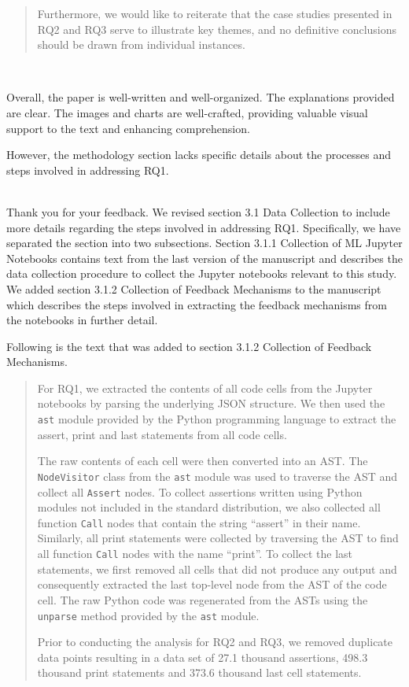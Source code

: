 \documentclass[11pt,fleqn]{article}
\newcommand{\eline}{\vspace*{.75\baselineskip}}
\newcommand{\Referee}[1]{\eline \noindent {\bf Reviewer comment #1:} \\}
\newcommand{\Us}{\eline \noindent {\bf Response:}\\}
\newenvironment{revcomment}[1][]
{\Referee{#1}\begin{rcomment}}
{\end{rcomment}}
\begin{document}
\begin{quote}
  Furthermore, we would like to reiterate that the case studies presented in RQ2 and RQ3 serve to illustrate key themes, and no definitive conclusions should be drawn from individual instances.
\end{quote}

\begin{revcomment}[1.7]
  Overall, the paper is well-written and well-organized. The explanations provided are clear. The images and charts are well-crafted, providing valuable visual support to the text and enhancing comprehension.

  However, the methodology section lacks specific details about the processes and steps involved in addressing RQ1.
\end{revcomment}

\Us Thank you for your feedback. We revised section 3.1 Data Collection to include more details regarding the steps involved in addressing RQ1. Specifically, we have separated the section into two subsections. Section 3.1.1 Collection of ML Jupyter Notebooks contains text from the last version of the manuscript and describes the data collection procedure to collect the Jupyter notebooks relevant to this study. We added section 3.1.2 Collection of Feedback Mechanisms to the manuscript which describes the steps involved in extracting the feedback mechanisms from the notebooks in further detail.

Following is the text that was added to section 3.1.2 Collection of Feedback Mechanisms.

\begin{quote}
  For RQ1, we extracted the contents of all code cells from the Jupyter notebooks by parsing the underlying JSON structure. We then used the \texttt{ast} module provided by the Python programming language to extract the assert, print and last statements from all code cells.

  The raw contents of each cell were then converted into an AST. The \texttt{NodeVisitor} class from the \texttt{ast} module was used to traverse the AST and collect all \texttt{Assert} nodes. To collect assertions written using Python modules not included in the standard distribution, we also collected all function \texttt{Call} nodes that contain the string ``assert'' in their name. Similarly, all print statements were collected by traversing the AST to find all function \texttt{Call} nodes with the name ``print''. To collect the last statements, we first removed all cells that did not produce any output and consequently extracted the last top-level node from the AST of the code cell. The raw Python code was regenerated from the ASTs using the \texttt{unparse} method provided by the \texttt{ast} module.

  Prior to conducting the analysis for RQ2 and RQ3, we removed duplicate data points resulting in a data set of 27.1 thousand assertions, 498.3 thousand print statements and 373.6 thousand last cell statements.
\end{quote}
\end{document}
